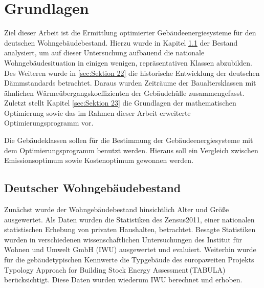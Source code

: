 \chapter{Grundlagen}

Ziel dieser Arbeit ist die Ermittlung optimierter Gebäudeenergiesysteme für den deutschen Wohngebäudebestand.
Hierzu wurde in Kapitel \ref{sec:Sektion 21} der Bestand analysiert, um auf dieser Untersuchung aufbauend die nationale Wohngebäudesituation in einigen wenigen, repräsentativen Klassen abzubilden. 
Des Weiteren wurde in \ref{sec:Sektion 22} die historische Entwicklung der deutschen Dämmstandards betrachtet. Daraus wurden Zeiträume der Baualtersklassen mit ähnlichen Wärmeübergangskoeffizienten der Gebäudehülle zusammengefasst. 
Zuletzt stellt Kapitel \ref{sec:Sektion 23} die Grundlagen der mathematischen Optimierung sowie das im Rahmen dieser Arbeit erweiterte Optimierungsprogramm vor. 

Die Gebäudeklassen sollen für die Bestimmung der Gebäudeenergiesysteme mit dem Optimierungsprogramm benutzt werden. 
Hieraus soll ein Vergleich zwischen Emissionsoptimum sowie Kostenoptimum gewonnen werden.






\section{Deutscher Wohngebäudebestand}
\label{sec:Sektion 21}

Zunächst wurde der Wohngebäudebestand hinsichtlich Alter und Größe ausgewertet.
Als Daten wurden die Statistiken des Zensus2011, einer nationalen statistischen Erhebung von privaten Haushalten, betrachtet. 
Besagte Statistiken wurden in verschiedenen wissenschaftlichen Untersuchungen des Institut für Wohnen und Umwelt GmbH (IWU) ausgewertet und evaluiert.
Weiterhin wurde für die gebäudetypischen Kennwerte die Typgebäude des europaweiten Projekts \glqq Typology Approach for Building Stock Energy Assessment\grqq\,(TABULA) berücksichtigt. Diese Daten wurden wiederum IWU berechnet und erhoben.

